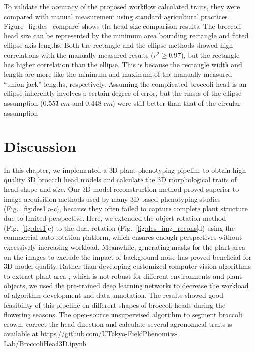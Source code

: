 To validate the accuracy of the proposed workflow calculated traits, they were compared with manual measurement using standard agricultural practices. Figure~\ref{fig:des_compare} shows the head size comparison results. The broccoli head size can be represented by the minimum area bounding rectangle and fitted ellipse axis lengths. Both the rectangle and the ellipse methods showed high correlations with the manually measured results ($r^2 \geq 0.97$), but the rectangle has higher correlation than the ellipse. This is because the rectangle width and length are more like the minimum and maximum of the manually measured ``union jack'' lengths, respectively. Assuming the complicated broccoli head is an ellipse inherently involves a certain degree of error, but the \gls{rmse}s of the ellipse assumption (0.553 $cm$ and 0.448 $cm$) were still better than that of the circular assumption \citep[Table 5, \gls{rmse}=0.97 $cm$]{blok_image_2021}



\section{Discussion}

In this chapter, we implemented a 3D plant phenotyping pipeline to obtain high-quality 3D broccoli head models and calculate the 3D morphological traits of head shape and size. Our 3D model reconstruction method proved superior to image acquisition methods used by many 3D-based phenotyping studies (Fig.~\ref{fig:des1}a-c), because they often failed to capture complete plant structure due to limited perspective. Here, we extended the object rotation method (Fig.~\ref{fig:des1}c) to the dual-rotation (Fig.~\ref{fig:des_img_recons}d) using the commercial auto-rotation platform, which ensures enough perspectives without excessively increasing workload. Meanwhile, generating masks for the plant area on the images to exclude the impact of background noise has proved beneficial for 3D model quality. Rather than developing customized computer vision algorithms to extract plant area \citep{nguyen_3d_2016,kochi_3d_2018,kochi_all_2022}, which is not robust for different environments and plant objects, we used the pre-trained deep learning networks to decrease the workload of algorithm development and data annotation. The results showed good feasibility of this pipeline on different shapes of broccoli heads during the flowering seasons. The open-source unsupervised algorithm to segment broccoli crown, correct the head direction and calculate several agronomical traits is available at \url{https://github.com/UTokyo-FieldPhenomics-Lab/BroccoliHead3D.ipynb}.

